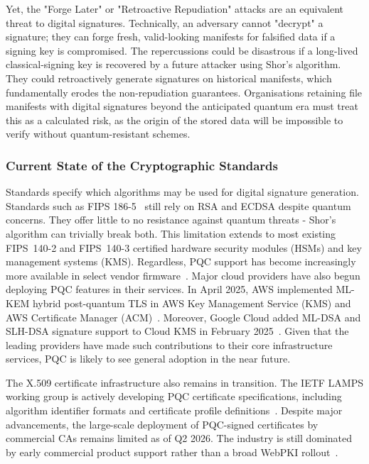 \documentclass[12pt,a4paper]{article}
\begin{document}
Yet, the "Forge Later" or "Retroactive Repudiation" attacks are an equivalent threat to digital signatures. Technically, an adversary cannot "decrypt" a signature; they can forge fresh, valid-looking manifests for falsified data if a signing key is compromised. The repercussions could be disastrous if a long-lived classical-signing key is recovered by a future attacker using Shor's algorithm. They could retroactively generate signatures on historical manifests, which fundamentally erodes the non-repudiation guarantees. Organisations retaining file manifests with digital signatures beyond the anticipated quantum era must treat this as a calculated risk, as the origin of the stored data will be impossible to verify without quantum-resistant schemes.

\subsubsection{Current State of the Cryptographic Standards}

Standards specify which algorithms may be used for digital signature generation. Standards such as FIPS 186-5~\cite{nist-fips-186-5-2023} still rely on RSA and ECDSA despite quantum concerns. They offer little to no resistance against quantum threats - Shor's algorithm can trivially break both. This limitation extends to most existing FIPS~140-2 and FIPS~140-3 certified hardware security modules (HSMs) and key management systems (KMS). Regardless, PQC support has become increasingly more available in select vendor firmware~\cite{thales-mldsa-2025}. Major cloud providers have also begun deploying PQC features in their services. In April 2025, AWS implemented ML-KEM hybrid post-quantum TLS in AWS Key Management Service (KMS) and AWS Certificate Manager (ACM)~\cite{aws-mlkem-deployment-2025}. Moreover, Google Cloud added ML-DSA and SLH-DSA signature support to Cloud KMS in February 2025~\cite{google-cloud-kms-pqc-2025}. Given that the leading providers have made such contributions to their core infrastructure services, PQC is likely to see general adoption in the near future. 

The X.509 certificate infrastructure also remains in transition. The IETF LAMPS working group is actively developing PQC certificate specifications, including algorithm identifier formats and certificate profile definitions~\cite{rfc9881-mldsa-x509,ietf-lamps-kyber-certs}. Despite major advancements, the large-scale deployment of PQC-signed certificates by commercial CAs remains limited as of Q2 2026. The industry is still dominated by early commercial product support rather than a broad WebPKI rollout~\cite{redsift-pqc-progress-2026}.
\end{document}
